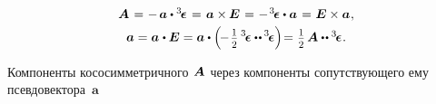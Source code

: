 \begin{otherlanguage}{russian}
\nopagebreak\vspace{-0.25em}\begin{equation}\label{companionvector}
\begin{array}{c}
\bm{A} \hspace{.2ex} = \hspace{.1ex} - \hspace{.3ex} \bm{a} \dotp \levicivitatensor \hspace{.2ex} = \hspace{.2ex} \bm{a} \times\hspace{-0.1ex} \UnitDyad \hspace{.2ex} = \hspace{.1ex} - \hspace{.2ex} \levicivitatensor \dotp \bm{a} \hspace{.2ex} = \hspace{.1ex} \UnitDyad \times \bm{a}
\hspace{.1ex} ,
\\[.3em]
%
\bm{a} = \bm{a} \hspace{.1ex} \dotp \UnitDyad = \bm{a} \dotp \left( \hspace{-0.3ex} - \displaystyle \hspace{.2ex} \smalldisplaystyleonehalf \hspace{.4ex} \levicivitatensor \dotdotp \hspace{-0.1ex} \levicivitatensor \right) \hspace{-0.4ex} = \hspace{.1ex} \smalldisplaystyleonehalf \hspace{.32ex} \bm{A} \dotdotp \levicivitatensor
\hspace{.1ex} .
\end{array}
\end{equation}

Компоненты кососимметричного~${\hspace{-0.2ex}\bm{A}}$ через компоненты сопутствующего ему псевдовектора~$\bm{a}$


\end{otherlanguage}
